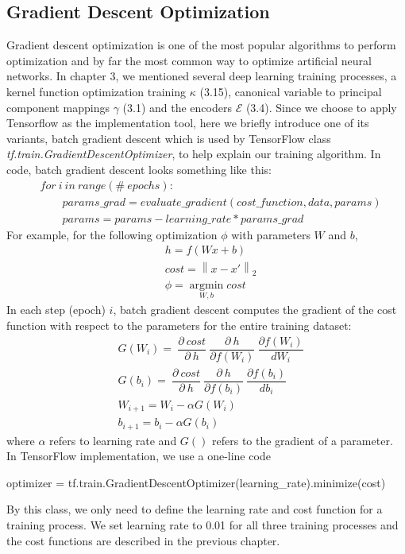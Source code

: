 \documentclass[12pt]{report} %
\newcommand{\norm}[1]{\left\lVert #1 \right\rVert}
\begin{document}
\subsection{Gradient Descent Optimization}
Gradient descent optimization\cite{GDO} is one of the most popular algorithms to perform optimization and by far the most common way to optimize artificial neural networks. In chapter 3, we mentioned several deep learning training processes, a kernel function optimization training $\kappa$ (3.15), canonical variable to principal component mappings $\gamma$ (3.1) and the encoders $\mathcal{E}$ (3.4). Since we choose to apply Tensorflow as the implementation tool, here we briefly introduce one of its variants, batch gradient descent which is used by TensorFlow class \textit{tf.train.GradientDescentOptimizer}\cite{TFGDO}, to help explain our training algorithm. In code, batch gradient descent looks something like this:
\begin{equation}
\begin{split}
&for\ i\ in\ range ( \#\ epochs ): \\
&\qquad params\_grad = evaluate\_gradient ( cost\_function , data , params ) \\
&\qquad params = params - learning\_rate * params\_grad
\end{split}
\end{equation}
For example, for the following optimization $\phi$ with parameters $W$ and $b$,
\begin{equation}
\begin{split}
&h=f(Wx +b)\\
&cost=\norm{x-x'}_2\\
&\phi=\operatorname*{argmin}_{W,b}cost
\end{split}
\end{equation}
In each step (epoch) $i$, batch gradient descent computes the gradient of the cost function with respect to the parameters for the entire training dataset:
\begin{equation}
\begin{split}
&G({W_i})=\ \dfrac{\partial\ cost}{\partial\ h}\ \dfrac{\partial\ h}{\partial f(W_i)}\ \dfrac{\partial f(W_i)}{dW_i} \\
&G({b_i}) =\ \dfrac{\partial\ cost}{\partial\ h}\ \dfrac{\partial\ h}{\partial f(b_i)}\ \dfrac{\partial f(b_i)}{db_i} \\
&W_{i+1}=W_i - \alpha G(W_i) \\
&b_{i+1}=b_i - \alpha G(b_i)
\end{split}
\end{equation}
where $\alpha$ refers to learning rate and $G()$ refers to the gradient of a parameter. In TensorFlow implementation, we use a one-line code
\begin{center}
	optimizer = tf.train.GradientDescentOptimizer(learning\_rate).minimize(cost)
\end{center}
By this class, we only need to define the learning rate and cost function for a training process. We set learning rate to 0.01 for all three training processes and the cost functions are described in the previous chapter.
\end{document}
